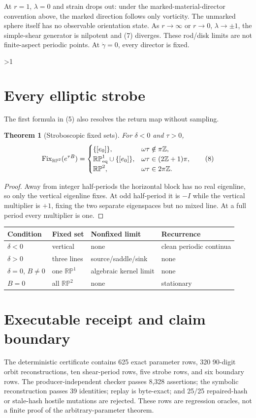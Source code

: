 \documentclass[10pt]{article}
\providecommand{\CRevisionRound}{2}
\newtheorem{theorem}{Theorem}
\newcommand{\RP}{\mathbb{RP}}
\newcommand{\Fix}{\operatorname{Fix}}
\begin{document}
At $r=1$, $\lambda=0$ and strain drops out: under the marked-material-director
convention above, the marked direction follows only vorticity.  The unmarked
sphere itself has no observable orientation state.
As $r\to\infty$ or $r\to0$, $\lambda\to\pm1$, the simple-shear generator is
nilpotent and (7) diverges.  These rod/disk limits are not finite-aspect
periodic points.  At $\dot\gamma=0$, every director is fixed.
\fi

\ifnum\CRevisionRound>1
\section{Every elliptic strobe}
The first formula in (5) also resolves the return map without sampling.

\begin{theorem}[Stroboscopic fixed sets]
For $\delta<0$ and $\tau>0$,
\[
 \Fix_{\RP^2}(e^{\tau B})=
 \begin{cases}
 \{[e_0]\},&\omega\tau\notin\pi\mathbb Z,\\
 \RP^1_{\rm eq}\cup\{[e_0]\},&\omega\tau\in(2\mathbb Z+1)\pi,\\
 \RP^2,&\omega\tau\in2\pi\mathbb Z.
 \end{cases} \tag{8}
\]
\end{theorem}
\begin{proof}
Away from integer half-periods the horizontal block has no real eigenline, so
only the vertical eigenline fixes.  At odd half-period it is $-I$ while the
vertical multiplier is $+1$, fixing the two separate eigenspaces but no mixed
line.  At a full period every multiplier is one.
\end{proof}

\begin{center}
\small
\begin{tabular}{@{}llll@{}}
\toprule
Condition & Fixed set & Nonfixed limit & Recurrence\\
\midrule
$\delta<0$ & vertical & none & clean periodic continua\\
$\delta>0$ & three lines & source/saddle/sink & none\\
$\delta=0$, $B\ne0$ & one $\RP^1$ & algebraic kernel limit & none\\
$B=0$ & all $\RP^2$ & none & stationary\\
\bottomrule
\end{tabular}
\end{center}
\fi

\section{Executable receipt and claim boundary}
The deterministic certificate contains 625 exact parameter rows, 320
90-digit orbit reconstructions, ten shear-period rows, five strobe rows, and
six boundary rows.  The producer-independent checker passes 8,328 assertions;
the symbolic reconstruction passes 39 identities; replay is byte-exact; and
25/25 repaired-hash or stale-hash hostile mutations are rejected.  These rows
are regression oracles, not a finite proof of the arbitrary-parameter theorem.
\end{document}
